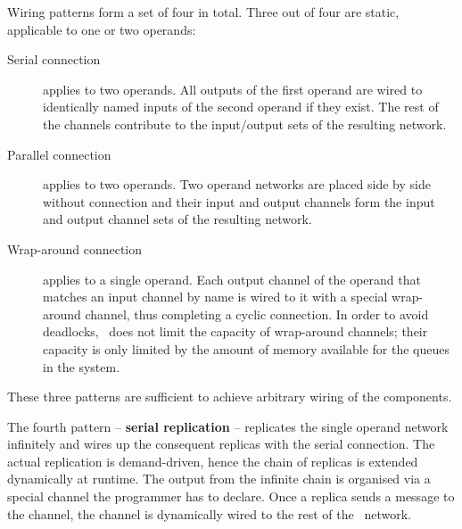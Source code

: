 Wiring patterns form a set of four in total. Three out of four are static, applicable to one or two operands:
\begin{description}
\item[Serial connection] applies to two operands. All outputs of the first operand are wired to identically named inputs of the second operand if they exist. The rest of the channels contribute to the input/output sets of the resulting network.

\item[Parallel connection] applies to two operands. Two operand networks are placed side by side without connection and their input and output channels form the input and output channel sets of the resulting network.

\item[Wrap-around connection] applies to a single operand. Each output channel of the operand that matches an input channel by name is wired to it with a special wrap-around channel, thus completing a cyclic connection. In order to avoid deadlocks, \ak\ does not limit the capacity of wrap-around channels; their capacity is only limited by the amount of memory available for the queues in the system.
\end{description}
These three patterns are sufficient to achieve arbitrary wiring of the components.

The fourth pattern -- \textbf{serial replication} -- replicates the single operand network infinitely and wires up the consequent replicas with the serial connection. The actual replication is demand-driven, hence the chain of replicas is extended dynamically at runtime. The output from the infinite chain is organised via a special channel the programmer has to declare. Once a replica sends a message to the channel, the channel is dynamically wired to the rest of the \ak\ network.


